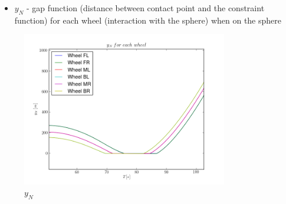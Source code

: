 \begin{itemize}
  \item $y_{N}$ - gap function (distance between contact point and the constraint function) for each wheel (interaction with the sphere) when on the sphere
\end{itemize}

\begin{figure}[H]
  \centering
    \includegraphics[width=0.8\textwidth]{yN6sphere}
  \caption{$y_{N}$}
\end{figure}







%
%


